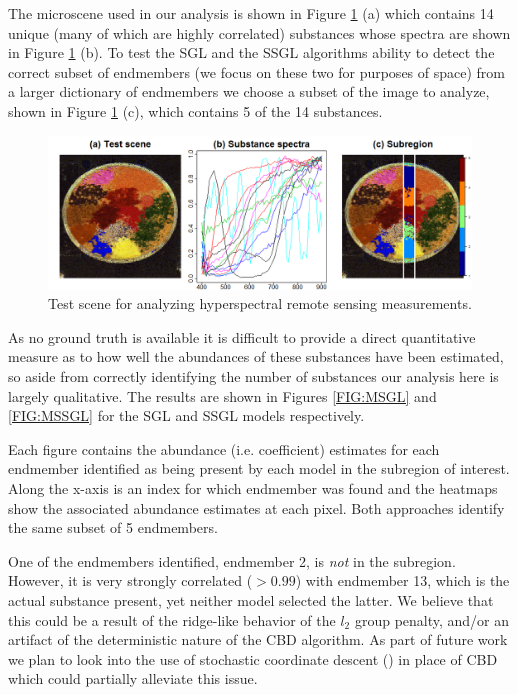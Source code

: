 \documentclass{article}
\numberwithin{equation}{section}
\theoremstyle{plain}
\begin{document}
The microscene used in our analysis is shown in Figure \ref{FIG:PETRI} (a) which
contains 14 unique (many of which are highly correlated) substances whose
spectra are shown in Figure \ref{FIG:PETRI} (b). To test the SGL and the SSGL
algorithms ability to detect the correct subset of endmembers (we focus on these
two for purposes of space) from a larger dictionary of endmembers we choose a
subset of the image to analyze, shown in Figure \ref{FIG:PETRI} (c), which
contains 5 of the 14 substances.

\begin{figure}
\begin{center}
\includegraphics[width = 5in]{petri.png}
\caption{Test scene for analyzing hyperspectral remote sensing measurements.}
\label{FIG:PETRI}
\end{center}
\end{figure}
 
As no ground truth is available it is difficult to provide a direct quantitative
measure as to how well the abundances of these substances have been estimated,
so aside from correctly identifying the number of substances our analysis here
is largely qualitative. The results are shown in Figures \ref{FIG:MSGL} and
\ref{FIG:MSSGL} for the SGL and SSGL models respectively.
 
Each figure contains the abundance (i.e. coefficient) estimates for each
endmember identified as being present by each model in the subregion of
interest. Along the x-axis is an index for which endmember was found and the
heatmaps show the associated abundance estimates at each pixel.
Both approaches identify the same subset of 5 endmembers.

One of the endmembers identified, endmember 2, is {\it not} in the subregion.
However, it is very strongly correlated ($> 0.99$) with endmember 13, which is
the actual substance present, yet neither model selected the latter. We believe
that this could be a result of the ridge-like behavior of the $l_2$ group
penalty, and/or an artifact of the deterministic nature of the CBD algorithm. As
part of future work we plan to look into the use of stochastic coordinate
descent (\cite{shwartz2011}) in place of CBD which could partially alleviate
this issue.
\end{document}
